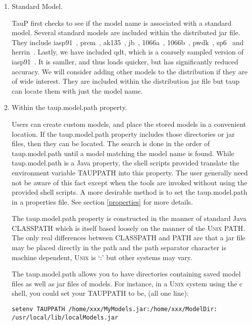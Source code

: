 \begin{enumerate}
\item Standard Model.

TauP first checks to see if the model name is associated with a standard model.
Several standard models are included within the distributed jar file.
They include
iasp91~\cite{iasp},
prem~\cite{dziewonski_anderson},
ak135~\cite{kennett:ak135},
jb~\cite{jb},
1066a~\cite{gilbert_dziewonski},
1066b~\cite{gilbert_dziewonski},
pwdk~\cite{weber_davis},
sp6~\cite{morelli} and
herrin~\cite{herrin}. Lastly, we have included qdt, which is a coarsely sampled version of iasp91~\cite{iasp}. It is samller, and thus loads quicker, but has significantly reduced accuracy.
We will consider adding other models to the distribution if
they are of wide interest.
They are included within the distribution jar file but
taup can locate them with just the model name.

\item Within the taup.model.path property.

Users can create custom models, and place the stored models in a convenient
location. If the taup.model.path property includes those
directories or jar files, then they can be located.
The search is done in the order of taup.model.path until a model matching the model
name is found. While taup.model.path is a Java property, the shell scripts provided
translate the environment variable TAUPPATH into this property. The user
generally need not be aware of this fact except when the tools are invoked
without using the provided shell scripts. A more desirable method is to
set the taup.model.path in a properties file. See section \ref{properties} for
more details.

The taup.model.path property is constructed in the manner of standard Java CLASSPATH
which is itself based loosely on the manner of the \textsc{Unix} PATH.
The only real
differences between CLASSPATH and PATH are that a jar file
may be placed directly in the path and the path separator character
is machine dependent, \textsc{Unix} is `:' but other systems may vary.

The taup.model.path allows you to have directories containing saved model files
as well as jar files of models.
For instance, in a \textsc{Unix} system using the c shell,
you could set your TAUPPATH to be, (all one line):

\begin{verbatim}
setenv TAUPPATH /home/xxx/MyModels.jar:/home/xxx/ModelDir:
/usr/local/lib/localModels.jar
\end{verbatim}


\end{enumerate}
